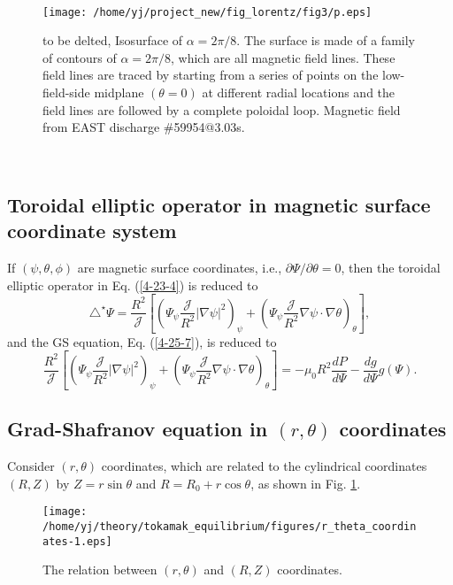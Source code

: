 \documentclass{article}
\begin{document}
\

\begin{figure}[h]
  \texttt{[image: /home/yj/project\_new/fig\_lorentz/fig3/p.eps]}
  \caption{to be delted, Isosurface of $\alpha = 2 \pi / 8$. The surface is
  made of a family of contours of $\alpha = 2 \pi / 8$, which are all magnetic
  field lines. These field lines are traced by starting from a series of
  points on the low-field-side midplane $(\theta = 0)$ at different radial
  locations and the field lines are followed by a complete poloidal loop.
  Magnetic field from EAST discharge \#59954@3.03s.}
\end{figure}

\

\subsection{\label{4-25-9}Toroidal elliptic operator in magnetic surface
coordinate system}

If $(\psi, \theta, \phi)$ are magnetic surface coordinates, i.e., $\partial
\Psi / \partial \theta = 0$, then the toroidal elliptic operator in Eq.
(\ref{4-23-4}) is reduced to
\begin{equation}
  \triangle^{\star} \Psi = \frac{R^2}{\mathcal{J}} \left[ \left( \Psi_{\psi}
  \frac{\mathcal{J}}{R^2} | \nabla \psi |^2 \right)_{\psi} + \left(
  \Psi_{\psi} \frac{\mathcal{J}}{R^2} \nabla \psi \cdot \nabla \theta
  \right)_{\theta} \right],
\end{equation}
and the GS equation, Eq. (\ref{4-25-7}), is reduced to
\begin{equation}
  \label{9-28-e1} \frac{R^2}{\mathcal{J}} \left[ \left( \Psi_{\psi}
  \frac{\mathcal{J}}{R^2} | \nabla \psi |^2 \right)_{\psi} + \left(
  \Psi_{\psi} \frac{\mathcal{J}}{R^2} \nabla \psi \cdot \nabla \theta
  \right)_{\theta} \right] = - \mu_0 R^2 \frac{d P}{d \Psi} - \frac{d g}{d
  \Psi} g (\Psi) .
\end{equation}
\subsection{Grad-Shafranov equation in $(r, \theta)$
coordinates}\label{17-11-22-p1}

Consider $(r, \theta)$ coordinates, which are related to the cylindrical
coordinates $(R, Z)$ by $Z = r \sin \theta$ and $R = R_0 + r \cos \theta$, as
shown in Fig. \ref{7-9-1}.

\begin{figure}[h]
  \texttt{[image: /home/yj/theory/tokamak\_equilibrium/figures/r\_theta\_coordinates-1.eps]}
  \caption{\label{7-9-1}The relation between $(r, \theta)$ and $(R, Z)$
  coordinates.}
\end{figure}
\end{document}
